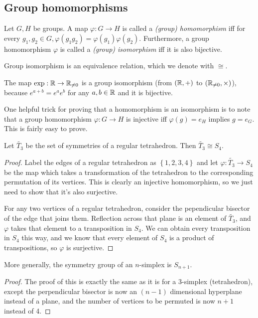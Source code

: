\documentclass[class=article, crop=false]{standalone}
\begin{document}
\subsection{Group homomorphisms}
Let $G,H$ be groups. A map $\varphi: G \rightarrow H$ is called a \emph{(group) homomorphism} iff for every $g_1, g_2 \in G, \varphi(g_1g_2)=\varphi(g_1)\varphi(g_2)$. Furthermore, a group homomorphism $\varphi$ is called a \emph{(group) isomorphism} iff it is also bijective.
\par
Group isomorphism is an equivalence relation, which we denote with $\cong$.
\begin{example}
    The map $\exp: \mathbb{R} \rightarrow \mathbb{R}_{\neq 0}$ is a group isomorphism (from $(\mathbb{R}, +)$ to $(\mathbb{R}_{\neq 0}, \times)$), because $e^{a+b}=e^ae^b$ for any $a,b \in \mathbb{R}$ and it is bijective.
\end{example}
One helpful trick for proving that a homomorphism is an isomorphism is to note that a group homomorphism $\varphi: G \rightarrow H$ is injective iff $\varphi(g)=e_H$ implies $g=e_G$. This is fairly easy to prove.
\begin{thm}
    Let $\widetilde{T_3}$ be the set of symmetries of a regular tetrahedron. Then $\widetilde{T_3} \cong S_4$.
\end{thm}
\begin{proof}
    Label the edges of a regular tetrahedron as $ \left\{ 1,2,3,4 \right\}$ and let $\varphi: \widetilde{T_3} \rightarrow S_4$ be the map which takes a transformation of the tetrahedron to the corresponding permutation of its vertices. This is clearly an injective homomorphism, so we just need to show that it's also surjective.
    \bigskip
    \par
    For any two vertices of a regular tetrahedron, consider the pependicular bisector of the edge that joins them. Reflection across that plane is an element of $\widetilde{T_3}$, and $\varphi$ takes that element to a transposition in $S_4$. We can obtain every transposition in $S_4$ this way, and we know that every element of $S_4$ is a product of transpositions, so $\varphi$ is surjective.
\end{proof}
\begin{prop}
    More generally, the symmetry group of an $n$-simplex is $S_{n+1}$.
\end{prop}
\begin{proof}
    The proof of this is exactly the same as it is for a 3-simplex (tetrahedron), except the perpendicular bisector is now an $(n-1)$ dimensional hyperplane instead of a plane, and the number of vertices to be permuted is now $n+1$ instead of 4.
\end{proof}
\end{document}
